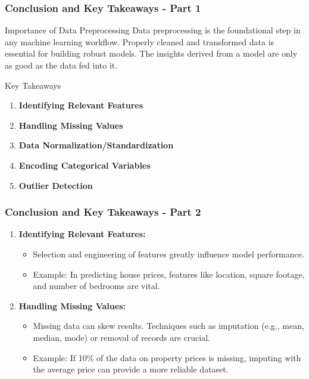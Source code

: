 \documentclass[aspectratio=169]{beamer}
\begin{document}
\begin{frame}[fragile]
    \frametitle{Conclusion and Key Takeaways - Part 1}
    \begin{block}{Importance of Data Preprocessing}
        Data preprocessing is the foundational step in any machine learning workflow. Properly cleaned and transformed data is essential for building robust models. The insights derived from a model are only as good as the data fed into it.
    \end{block}
    
    \begin{block}{Key Takeaways}
        \begin{enumerate}
            \item \textbf{Identifying Relevant Features}
            \item \textbf{Handling Missing Values}
            \item \textbf{Data Normalization/Standardization}
            \item \textbf{Encoding Categorical Variables}
            \item \textbf{Outlier Detection}
        \end{enumerate}
    \end{block}
\end{frame}

\begin{frame}[fragile]
    \frametitle{Conclusion and Key Takeaways - Part 2}
    \begin{enumerate}
        \setcounter{enumi}{0} %
        \item \textbf{Identifying Relevant Features:}
        \begin{itemize}
            \item Selection and engineering of features greatly influence model performance.
            \item Example: In predicting house prices, features like location, square footage, and number of bedrooms are vital.
        \end{itemize}
        
        \item \textbf{Handling Missing Values:}
        \begin{itemize}
            \item Missing data can skew results. Techniques such as imputation (e.g., mean, median, mode) or removal of records are crucial.
            \item Example: If 10\% of the data on property prices is missing, imputing with the average price can provide a more reliable dataset.
        \end{itemize}
    \end{enumerate}
\end{frame}
\end{document}
